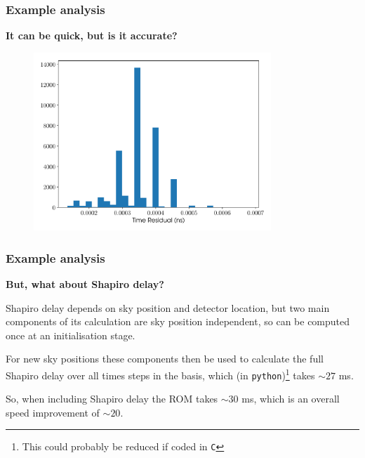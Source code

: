 \begin{frame}

\frametitle{Example analysis}
\label{exampleanalysis}

\textbf{It can be quick, but is it accurate?}

\begin{figure}[htbp]
\centering
\includegraphics[keepaspectratio,width=\textwidth,height=190pt]{images/validation.pdf}
\label{validation}
\end{figure}

\end{frame}

\begin{frame}

\frametitle{Example analysis}
\label{exampleanalysis}

\textbf{But, what about Shapiro delay?}

Shapiro delay depends on sky position and detector location, but two main components of its calculation are sky
position independent, so can be computed once at an initialisation stage. 

For new sky positions these components then be used to calculate the full Shapiro delay over all times steps in the basis,
which (in \texttt{python})\footnote{This could probably be reduced if coded in \texttt{C}} takes $\sim 27$ ms.

So, when including Shapiro delay the ROM takes $\sim 30$ ms, which is an overall speed improvement of $\sim 20$.

\end{frame}

